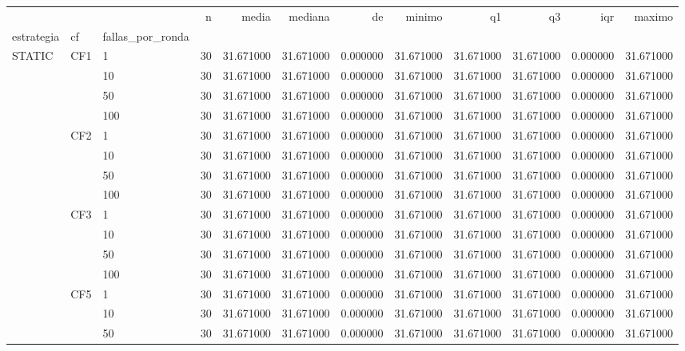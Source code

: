 \begin{tabular}{lllrrrrrrrrr}
\toprule
 &  &  & n & media & mediana & de & minimo & q1 & q3 & iqr & maximo \\
estrategia & cf & fallas_por_ronda &  &  &  &  &  &  &  &  &  \\
\midrule
\multirow[t]{16}{*}{STATIC} & \multirow[t]{4}{*}{CF1} & 1 & 30 & 31.671000 & 31.671000 & 0.000000 & 31.671000 & 31.671000 & 31.671000 & 0.000000 & 31.671000 \\
 &  & 10 & 30 & 31.671000 & 31.671000 & 0.000000 & 31.671000 & 31.671000 & 31.671000 & 0.000000 & 31.671000 \\
 &  & 50 & 30 & 31.671000 & 31.671000 & 0.000000 & 31.671000 & 31.671000 & 31.671000 & 0.000000 & 31.671000 \\
 &  & 100 & 30 & 31.671000 & 31.671000 & 0.000000 & 31.671000 & 31.671000 & 31.671000 & 0.000000 & 31.671000 \\
\cline{2-12}
 & \multirow[t]{4}{*}{CF2} & 1 & 30 & 31.671000 & 31.671000 & 0.000000 & 31.671000 & 31.671000 & 31.671000 & 0.000000 & 31.671000 \\
 &  & 10 & 30 & 31.671000 & 31.671000 & 0.000000 & 31.671000 & 31.671000 & 31.671000 & 0.000000 & 31.671000 \\
 &  & 50 & 30 & 31.671000 & 31.671000 & 0.000000 & 31.671000 & 31.671000 & 31.671000 & 0.000000 & 31.671000 \\
 &  & 100 & 30 & 31.671000 & 31.671000 & 0.000000 & 31.671000 & 31.671000 & 31.671000 & 0.000000 & 31.671000 \\
\cline{2-12}
 & \multirow[t]{4}{*}{CF3} & 1 & 30 & 31.671000 & 31.671000 & 0.000000 & 31.671000 & 31.671000 & 31.671000 & 0.000000 & 31.671000 \\
 &  & 10 & 30 & 31.671000 & 31.671000 & 0.000000 & 31.671000 & 31.671000 & 31.671000 & 0.000000 & 31.671000 \\
 &  & 50 & 30 & 31.671000 & 31.671000 & 0.000000 & 31.671000 & 31.671000 & 31.671000 & 0.000000 & 31.671000 \\
 &  & 100 & 30 & 31.671000 & 31.671000 & 0.000000 & 31.671000 & 31.671000 & 31.671000 & 0.000000 & 31.671000 \\
\cline{2-12}
 & \multirow[t]{4}{*}{CF5} & 1 & 30 & 31.671000 & 31.671000 & 0.000000 & 31.671000 & 31.671000 & 31.671000 & 0.000000 & 31.671000 \\
 &  & 10 & 30 & 31.671000 & 31.671000 & 0.000000 & 31.671000 & 31.671000 & 31.671000 & 0.000000 & 31.671000 \\
 &  & 50 & 30 & 31.671000 & 31.671000 & 0.000000 & 31.671000 & 31.671000 & 31.671000 & 0.000000 & 31.671000 \\

\end{tabular}
